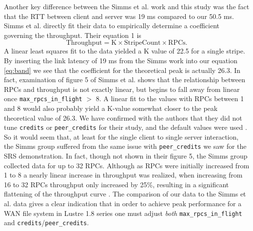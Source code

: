 \documentclass[]{sigplan-proc}
\begin{document}
Another key difference between the Simms et al. work and this study was the fact
that the RTT between client and server was 19 ms compared to our 50.5 ms. Simms et al. directly fit their data
to empirically determine a coefficient governing the throughput. Their equation 1 is
\begin{equation}
\mathrm{Throughput = K \times Stripe Count \times RPCs.}
\end{equation}
A linear least squares fit to the data yielded a K value of 22.5 for a single stripe. By inserting the link
latency of 19 ms from the Simms work into our equation \ref{eq:band} we see that the coefficient for the
theoretical peak is actually 26.3. In fact, examination of figure 5 of Simms et al. \cite{simms2007} shows
that the relationship between RPCs and throughput is not exactly linear, but begins to fall away from linear
once {\tt max\_rpcs\_in\_flight} $>$ 8. A linear fit to the values with RPCs between 1 and 8 would also
probably yield a K-value somewhat closer to the peak theoretical value of 26.3. We have confirmed with the
authors that they did not tune {\tt credits} or {\tt peer\_credits} for their study, and the default values
were used \cite{simmsprivate}. So it would seem that, at least for the single client to single server
interaction, the Simms group suffered from the same issue with {\tt peer\_credits} we saw for the SRS
demonstration. In fact, though not shown in their figure 5, the Simms group collected data for up to 32
RPCs. Although as RPCs were initially increased from 1 to 8 a nearly linear increase in throughput was
realized, when increasing from 16 to 32 RPCs throughput only increased by 25\%, resulting in a significant
flattening of the throughput curve \cite{simmsprivate}. The comparison of our data to the Simms et al. data
gives a clear indication that in order to achieve peak performance for a WAN file system in Lustre 1.8 series
one must adjust {\it both} {\tt max\_rpcs\_in\_flight} and {\tt credits}/{\tt peer\_credits}.
\end{document}
